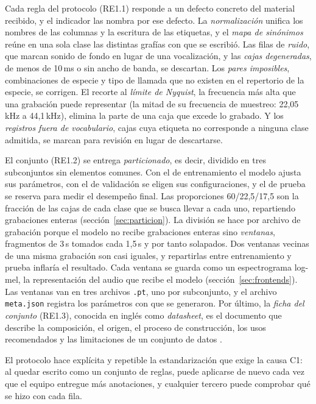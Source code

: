 Cada regla del protocolo (RE1.1) responde a un defecto concreto del material
recibido, y el indicador las nombra por ese defecto. La \emph{normalización}
unifica los nombres de las columnas y la escritura de las etiquetas, y el
\emph{mapa de sinónimos} reúne en una sola clase las distintas grafías con que se
escribió. Las filas de \emph{ruido}, que marcan sonido de fondo en lugar de una
vocalización, y las \emph{cajas degeneradas}, de menos de 10\,ms o sin ancho
de banda, se descartan. Los
\emph{pares imposibles}, combinaciones de especie y tipo de llamada que no
existen en el repertorio de la especie, se corrigen. El recorte al \emph{límite
de Nyquist}, la frecuencia más alta que una grabación puede representar (la mitad
de su frecuencia de muestreo: 22,05\,kHz a 44,1\,kHz), elimina la parte de una
caja que excede lo grabado. Y los \emph{registros fuera de vocabulario}, cajas
cuya etiqueta no corresponde a ninguna clase admitida, se marcan para revisión en
lugar de descartarse.

El conjunto (RE1.2) se entrega \emph{particionado}, es decir, dividido en tres
subconjuntos sin elementos comunes. Con el de entrenamiento el modelo ajusta sus
parámetros, con el de validación se eligen sus configuraciones, y el de prueba se
reserva para medir el desempeño final. Las proporciones 60/22,5/17,5 son la
fracción de las cajas de cada clase que se busca llevar a cada uno, repartiendo
grabaciones enteras (sección~\ref{sec:particion}). La división se hace por archivo de
grabación porque el modelo no recibe grabaciones enteras sino \emph{ventanas},
fragmentos de 3\,s tomados cada 1,5\,s y por tanto solapados. Dos ventanas vecinas
de una misma grabación son casi iguales, y repartirlas entre entrenamiento y
prueba inflaría el resultado. Cada ventana se guarda como un espectrograma
log-mel, la representación del audio que recibe el modelo
(sección~\ref{sec:frontends}). Las ventanas van en tres archivos \texttt{.pt}, uno
por subconjunto, y el archivo \texttt{meta.json} registra los parámetros con que
se generaron. Por último, la \emph{ficha del conjunto} (RE1.3), conocida en inglés
como \textit{datasheet}, es el documento que describe la composición, el origen,
el proceso de construcción, los usos recomendados y las limitaciones de un
conjunto de datos \citep{gebru_2021}.

 El protocolo hace explícita y repetible la
estandarización que exige la causa C1: al quedar escrito como un conjunto de
reglas, puede aplicarse de nuevo cada vez que el equipo entregue más anotaciones,
y cualquier tercero puede comprobar qué se hizo con cada fila.

